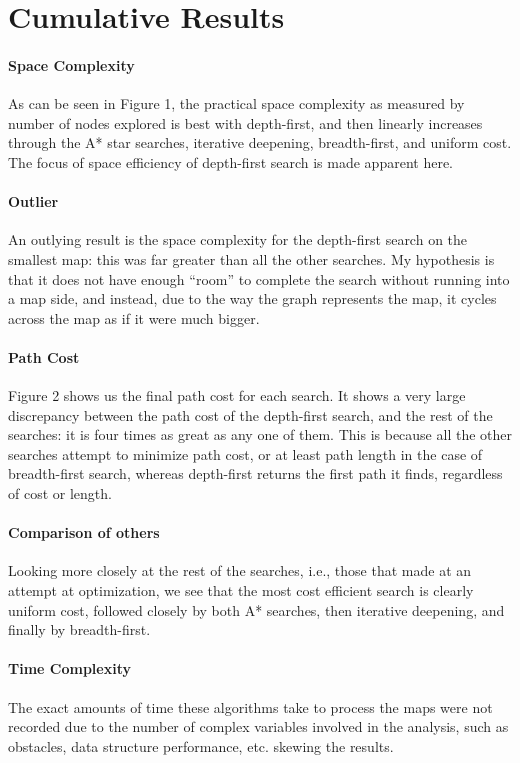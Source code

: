 \documentclass[12pt, article]{scrartcl}
\begin{document}
\section{Cumulative Results}
\paragraph{Space Complexity}
As can be seen in Figure 1, the practical space complexity as measured by number of nodes explored is best with depth-first, and then linearly increases through the A* star searches, iterative deepening, breadth-first, and uniform cost. The focus of space efficiency of depth-first search is made apparent here.
\paragraph{Outlier}
An outlying result is the space complexity for the depth-first search on the smallest map: this was far greater than all the other searches. My hypothesis is that it does not have enough ``room'' to complete the search without running into a map side, and instead, due to the way the graph represents the map, it cycles across the map as if it were much bigger.

\paragraph{Path Cost}
Figure 2 shows us the final path cost for each search. It shows a very large discrepancy between the path cost of the depth-first search, and the rest of the searches: it is four times as great as any one of them. This is because all the other searches attempt to minimize path cost, or at least path length in the case of breadth-first search, whereas depth-first returns the first path it finds, regardless of cost or length.
\paragraph{Comparison of others}
Looking more closely at the rest of the searches, i.e., those that made at an attempt at optimization, we see that the most cost efficient search is clearly uniform cost, followed closely by both A* searches, then iterative deepening, and finally by breadth-first.

\paragraph{Time Complexity}
The exact amounts of time these algorithms take to process the maps were not recorded due to the number of complex variables involved in the analysis, such as obstacles, data structure performance, etc. skewing the results.
\end{document}
